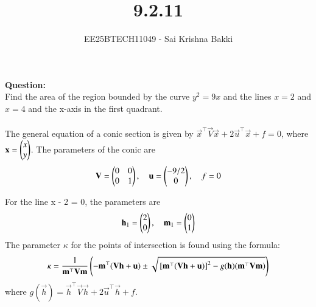 \documentclass[journal]{IEEEtran}
\begin{document}

\vspace{3cm}

\title{9.2.11}
\author{EE25BTECH11049 - Sai Krishna Bakki}
 \maketitle
{\let\newpage\relax\maketitle}

\renewcommand{\thefigure}{\theenumi}
\renewcommand{\thetable}{\theenumi}
\setlength{\intextsep}{10pt} %


\renewcommand{\thetable}{\theenumi}
\textbf{Question:}\\
Find the area of the region bounded by the curve $y^2 = 9x$ and the lines $x = 2$ and $x = 4$ and the x-axis in the first quadrant.\\

\solution\\
The general equation of a conic section is given by $\vec{x}^\top\vec{V}\vec{x} + 2\vec{u}^\top\vec{x} + f = 0$, where $\mathbf{x} = \begin{pmatrix}x \\ y\end{pmatrix}$.
The parameters of the conic are
\begin{align}
\mathbf{V} = \begin{pmatrix}0 & 0 \\ 0 & 1\end{pmatrix}, \quad \mathbf{u} = \begin{pmatrix}-9/2 \\ 0\end{pmatrix}, \quad f = 0
\end{align}

For the line x - 2 = 0, the parameters are
\begin{align}
\mathbf{h}_1 = \begin{pmatrix}2 \\ 0\end{pmatrix}, \quad \mathbf{m}_1 = \begin{pmatrix}0 \\ 1\end{pmatrix}
\end{align}
The parameter $\kappa$ for the points of intersection is found using the formula:
\begin{align}
\kappa = \frac{1}{\mathbf{m}^\top \mathbf{V} \mathbf{m}}\left(-\mathbf{m}^\top(\mathbf{V}\mathbf{h}+\mathbf{u}) \pm \sqrt{{}\left[\mathbf{m}^\top(\mathbf{V}\mathbf{h}+\mathbf{u})\right]^2 - g(\mathbf{h})(\mathbf{m}^\top \mathbf{V} \mathbf{m})}\right)
\end{align}
where $g(\vec{h}) = \vec{h}^\top \vec{V} \vec{h} + 2\vec{u}^\top \vec{h} + f$.
\end{document}
